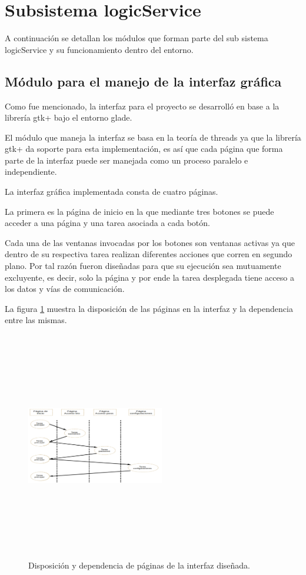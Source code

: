 \section{Subsistema logicService}
A continuación se detallan los módulos que forman parte del sub sistema logicService y su funcionamiento dentro del entorno.
\subsection{Módulo para el manejo de la interfaz gráfica}
Como fue mencionado, la interfaz para el proyecto se desarrolló en base a la librería gtk+ bajo el entorno glade. 

El módulo que maneja la interfaz se basa en la teoría de threads ya que la librería gtk+ da soporte para esta implementación, es así que cada página que forma parte de la interfaz puede ser manejada como un proceso paralelo e independiente.

La interfaz gráfica implementada consta de cuatro páginas. 

La primera es la página de inicio en la que mediante tres botones se puede acceder a una página y una tarea asociada a cada botón.

Cada una de las ventanas invocadas por los botones son ventanas activas ya que dentro de su respectiva tarea realizan diferentes acciones que corren en segundo plano. Por tal razón fueron diseñadas para que su ejecución sea mutuamente excluyente, es decir, solo la página y por ende la tarea desplegada tiene acceso a los datos y vías de comunicación.

La figura \ref{fig:paginas} muestra la disposición de las páginas en la interfaz y la dependencia entre las mismas.

\begin{figure}[H]
	\centering
	\includegraphics[height=10cm,width=6cm]{./Figures/paginas.png}
	\caption{Disposición y dependencia de páginas de la interfaz diseñada.}
	\label{fig:paginas}
\end{figure}


